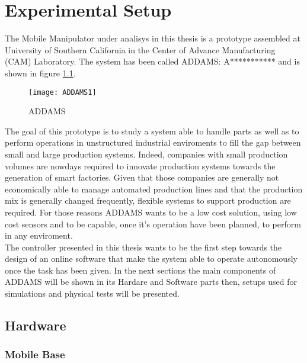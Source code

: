 
\chapter{Experimental Setup}
\label{chapter6}

The Mobile Manipulator under analisys in this thesis is a prototype assembled at University of Southern California in the Center of Advance Manufacturing (CAM) Laboratory. The system has been called ADDAMS: A*********** and is shown in figure \ref{imgADDAMS1}.

\begin{figure}[h] \label{imgADDAMS1}
	\begin{center} 
		\texttt{[image: ADDAMS1]}
		\centering
		\caption{ADDAMS}
	\end{center}
\end{figure}

 The goal of this prototype is to study a system able to handle parts as well as to perform operations in unstructured industrial enviroments to fill the gap between small and large production systems. Indeed, companies with small production volumes are nowdays required to innovate production systems towards the generation of smart factories. Given that those companies are generally not economically able to manage automated production lines and that the production mix is generally changed frequently, flexible systems to support production are required. For those reasons ADDAMS wants to be a low cost solution, using low cost sensors and to be capable, once it's operation have been planned, to perform in any enviroment. \\

The controller presented in this thesis wants to be the first step towards the design of an online software that make the system able to operate autonomously once the task has been given. In the next sections the main components of ADDAMS will be shown in its Hardare and Software parts then, setups used for simulations and physical tests will be presented. 



\section{Hardware}

\subsection{Mobile Base}

